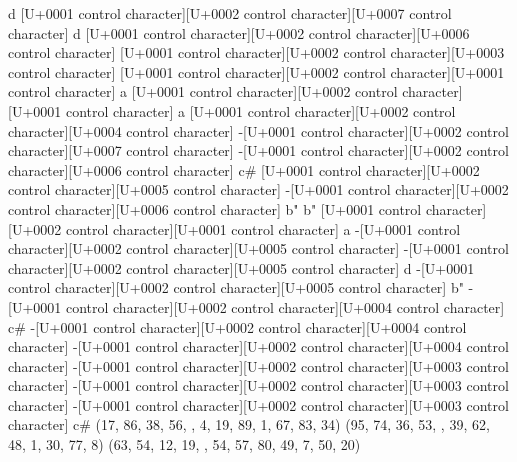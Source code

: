 \documentclass[10pt]{article}
\begin{document}
\begin{ReviewVerbatim}
                                                      d     [U+0001 control character][U+0002 control character][U+0007 control character]                                                  d     [U+0001 control character][U+0002 control character][U+0006 control character]
 [U+0001 control character][U+0002 control character][U+0003 control character]
                                                            [U+0001 control character][U+0002 control character][U+0001 control character]                                                  a     [U+0001 control character][U+0002 control character][U+0001 control character]                                                   a
 [U+0001 control character][U+0002 control character][U+0004 control character]
                                                           -[U+0001 control character][U+0002 control character][U+0007 control character]                                                       -[U+0001 control character][U+0002 control character][U+0006 control character]                                                   c#
 [U+0001 control character][U+0002 control character][U+0005 control character]
                                                           -[U+0001 control character][U+0002 control character][U+0006 control character]                                                  b"                                                          b"
 [U+0001 control character][U+0002 control character][U+0001 control character]                                                  a    -[U+0001 control character][U+0002 control character][U+0005 control character]
                                                                                                                      -[U+0001 control character][U+0002 control character][U+0005 control character]
                                                                                                                                                                             d
-[U+0001 control character][U+0002 control character][U+0005 control character]
                                                      b"   -[U+0001 control character][U+0002 control character][U+0004 control character]                                                  c#   -[U+0001 control character][U+0002 control character][U+0004 control character]
-[U+0001 control character][U+0002 control character][U+0004 control character]
                                                           -[U+0001 control character][U+0002 control character][U+0003 control character]                                                       -[U+0001 control character][U+0002 control character][U+0003 control character]
-[U+0001 control character][U+0002 control character][U+0003 control character]                                                  c#
       (17, 86, 38, 56, , 4, 19, 89, 1, 67, 83, 34)               (95, 74, 36, 53, , 39, 62, 48, 1, 30, 77, 8)               (63, 54, 12, 19, , 54, 57, 80, 49, 7, 50, 20)
\end{ReviewVerbatim}
\end{document}
